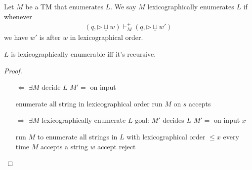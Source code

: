 \begin{definition}
    Let $M$ be a TM that enumerates $L$. We say $M$ lexicographically enumerates $L$ if whenever
    \begin{align*}
        (q, \triangleright \underline{\sqcup} w)\vdash_M^+ (q,\triangleright \underline{\sqcup}w')
    \end{align*}
    we have $w'$ is after $w$ in lexicographical order. 
\end{definition}

\begin{theorem}
    $L$ is lexicographically enumerable iff it's recursive. 
\end{theorem}
\begin{proof}\quad

    \begin{itemize}
        \item [$\Leftarrow$] $\exists M$ decide $L$
        \subitem $M'=$ on input
        \begin{algorithm}[H]
            \caption{$M'$}
            \begin{algorithmic}
                \State enumerate all string in lexicographical order
                    \State run $M$ on $s$
                        \State accepts 
                    \EndIf
                \EndFor
            \end{algorithmic}
        \end{algorithm}
        \item [$\Rightarrow$] $\exists M$ lexicographically enumerate $L$
        \subitem goal: $M'$ decides $L$
        \subitem $M'=$ on input $x$
        \begin{algorithm}[H]
            \caption{$M'$}
            \begin{algorithmic}
                \State run $M$ to enumerate all strings in $L$ with lexicographical order $\le x$
                \State every time $M$ accepts a string $w$
                    \State accept
                \Else
                    \State reject 
                \EndIf
            \end{algorithmic}
        \end{algorithm}
        
    \end{itemize}
\end{proof}
